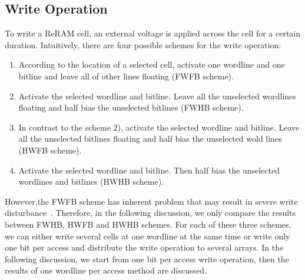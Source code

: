 \subsection{Write Operation}
To write a ReRAM cell, an external voltage is applied across the cell for
a certain duration. Intuitively, there are four possible schemes for the
write operation:
\begin{enumerate}
  \item According to the location of a selected cell, activate one
      wordline and one bitline and leave all of other lines floating
      (FWFB scheme).
  \item Activate the selected wordline and bitline. Leave all the
      unselected wordlines floating and half bias the unselected
      bitlines (FWHB scheme).
  \item In contrast to the scheme 2), activate the selected wordline
      and bitline. Leave all the unselected bitlines floating and half
      bias the unselected wold lines (HWFB scheme).
  \item Activate the selected wordline and bitline. Then half bias the unselected wordlines and bitlines (HWHB scheme).
\end{enumerate}
However,the FWFB scheme has inherent problem that may result in severe
write disturbance~\cite{crossbar_NANO2003_Ziegler}. Therefore, in the following discussion, we
only compare the results between FWHB, HWFB and HWHB schemes. For each of these
three schemes, we can either write several cells at one wordline at the
same time or write only one bit per access and distribute the write
operation to several arrays. In the following discussion, we start from
one bit per access write operation, then the results of one wordline per
access method are discussed.

